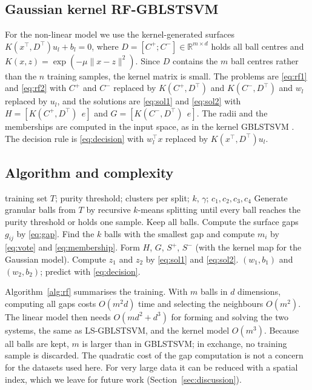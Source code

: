 \documentclass[preprint,12pt]{elsarticle}
\newcommand{\R}{\mathbb{R}}
\newcommand{\RF}{RF-GBLSTSVM}
\begin{document}
\subsection{Gaussian kernel \RF{}}

For the non-linear model we use the kernel-generated surfaces $K(x^{\top},D^{\top})u_l+b_l=0$, where $D=[C^{+};C^{-}]\in\R^{m\times d}$ holds all ball centres and $K(x,z)=\exp(-\mu\lVert x-z\rVert^{2})$. Since $D$ contains the $m$ ball centres rather than the $n$ training samples, the kernel matrix is small. The problems are \eqref{eq:rf1} and \eqref{eq:rf2} with $C^{+}$ and $C^{-}$ replaced by $K(C^{+},D^{\top})$ and $K(C^{-},D^{\top})$ and $w_l$ replaced by $u_l$, and the solutions are \eqref{eq:sol1} and \eqref{eq:sol2} with $H=[K(C^{+},D^{\top})\ \ e]$ and $G=[K(C^{-},D^{\top})\ \ e]$. The radii and the memberships are computed in the input space, as in the kernel GBLSTSVM \cite{tanveer2024gblstsvm}. The decision rule is \eqref{eq:decision} with $w_l^{\top}x$ replaced by $K(x^{\top},D^{\top})u_l$.

\subsection{Algorithm and complexity}

\begin{algorithm}[t]
\caption{Training of \RF{}}
\label{alg:rf}
\begin{algorithmic}[1]
\Require training set $T$; purity threshold; clusters per split; $k$, $\gamma$; $c_1,c_2,c_3,c_4$
\State Generate granular balls from $T$ by recursive $k$-means splitting until every ball reaches the purity threshold or holds one sample. Keep all balls.
\State Compute the surface gaps $g_{ij}$ by \eqref{eq:gap}.
\State Find the $k$ balls with the smallest gap and compute $m_i$ by \eqref{eq:vote} and \eqref{eq:membership}.
\EndFor
\State Form $H$, $G$, $S^{+}$, $S^{-}$ (with the kernel map for the Gaussian model).
\State Compute $z_1$ and $z_2$ by \eqref{eq:sol1} and \eqref{eq:sol2}.
\Ensure $(w_1,b_1)$ and $(w_2,b_2)$; predict with \eqref{eq:decision}.
\end{algorithmic}
\end{algorithm}

Algorithm~\ref{alg:rf} summarises the training. With $m$ balls in $d$ dimensions, computing all gaps costs $O(m^{2}d)$ time and selecting the neighbours $O(m^{2})$. The linear model then needs $O(md^{2}+d^{3})$ for forming and solving the two systems, the same as LS-GBLSTSVM, and the kernel model $O(m^{3})$. Because all balls are kept, $m$ is larger than in GBLSTSVM; in exchange, no training sample is discarded. The quadratic cost of the gap computation is not a concern for the datasets used here. For very large data it can be reduced with a spatial index, which we leave for future work (Section~\ref{sec:discussion}).
\end{document}
